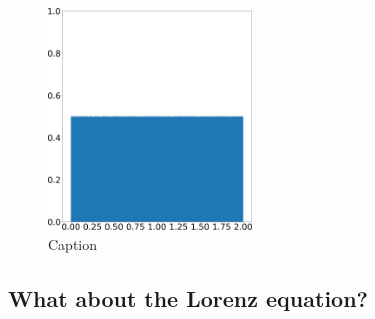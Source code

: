 \begin{figure}[H]
    \includegraphics[width=0.48\textwidth]{figure/tent_wave_physical_density_0.2.png}
    \caption{Caption}
    \label{fig:tent_wave_shadow}
\end{figure}

\subsection{What about the Lorenz equation?}

